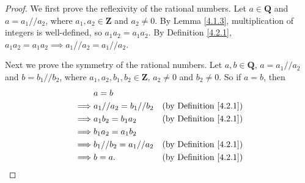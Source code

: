 \begin{proof}
    We first prove the reflexivity of the rational numbers.
    Let \(a \in \mathbf{Q}\) and \(a = a_1 // a_2\), where \(a_1, a_2 \in \mathbf{Z}\) and \(a_2 \neq 0\).
    By Lemma \ref{4.1.3}, multiplication of integers is well-defined, so \(a_1a_2 = a_1a_2\).
    By Definition \ref{4.2.1}, \(a_1a_2 = a_1a_2 \implies a_1 // a_2 = a_1 // a_2\).

    Next we prove the symmetry of the rational numbers.
    Let \(a, b \in \mathbf{Q}\), \(a = a_1 // a_2\) and \(b = b_1 // b_2\), where \(a_1, a_2, b_1, b_2 \in \mathbf{Z}\), \(a_2 \neq 0\) and \(b_2 \neq 0\).
    So if \(a = b\), then
    \begin{align*}
                 & a = b                                                        \\
        \implies & a_1 // a_2 = b_1 // b_2 & \text{(by Definition \ref{4.2.1})} \\
        \implies & a_1b_2 = b_1a_2         & \text{(by Definition \ref{4.2.1})} \\
        \implies & b_1a_2 = a_1b_2                                              \\
        \implies & b_1 // b_2 = a_1 // a_2 & \text{(by Definition \ref{4.2.1})} \\
        \implies & b = a.                  & \text{(by Definition \ref{4.2.1})}
    \end{align*}


\end{proof}
